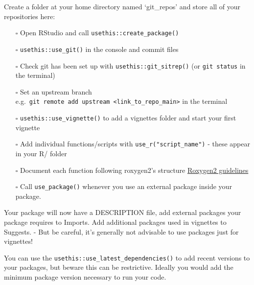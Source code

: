 \documentclass[
  letterpaper,
  DIV=11,
  numbers=noendperiod]{scrreprt}
\providecommand{\tightlist}{%
  \setlength{\itemsep}{0pt}\setlength{\parskip}{0pt}}\usepackage{longtable,booktabs,array}
\begin{document}
\begin{tcolorbox}[enhanced jigsaw, opacitybacktitle=0.6, breakable, title=\textcolor{quarto-callout-tip-color}{\faLightbulb}\hspace{0.5em}{Folder management}, arc=.35mm, colframe=quarto-callout-tip-color-frame, colbacktitle=quarto-callout-tip-color!10!white, left=2mm, bottomrule=.15mm, opacityback=0, toprule=.15mm, bottomtitle=1mm, toptitle=1mm, titlerule=0mm, leftrule=.75mm, colback=white, rightrule=.15mm, coltitle=black]

Create a folder at your home directory named `git\_repos' and store all
of your repositories here:

\end{tcolorbox}

\begin{itemize}
\tightlist
\item[$\square$]
  Open RStudio and call \texttt{usethis::create\_package()}
\item[$\square$]
  \texttt{usethis::use\_git()} in the console and commit files
\item[$\square$]
  Check git has been set up with \texttt{usethis::git\_sitrep()} (or
  \texttt{git\ status} in the terminal)
\item[$\square$]
  Set an upstream branch
  e.g.~\texttt{git\ remote\ add\ upstream\ \textless{}link\_to\_repo\_main\textgreater{}}
  in the terminal
\item[$\square$]
  \texttt{usethis::use\_vignette()} to add a vignettes folder and start
  your first vignette
\item[$\square$]
  Add individual functions/scripts with \texttt{use\_r("script\_name")}
  - these appear in your R/ folder
\item[$\square$]
  Document each function following roxygen2's structure
  \hyperref[roxygen2-gl]{Roxygen2 guidelines}
\item[$\square$]
  Call \texttt{use\_package()} whenever you use an external package
  inside your package.
\end{itemize}

\begin{tcolorbox}[enhanced jigsaw, opacitybacktitle=0.6, breakable, title=\textcolor{quarto-callout-tip-color}{\faLightbulb}\hspace{0.5em}{DESCRIPTION}, arc=.35mm, colframe=quarto-callout-tip-color-frame, colbacktitle=quarto-callout-tip-color!10!white, left=2mm, bottomrule=.15mm, opacityback=0, toprule=.15mm, bottomtitle=1mm, toptitle=1mm, titlerule=0mm, leftrule=.75mm, colback=white, rightrule=.15mm, coltitle=black]

Your package will now have a DESCRIPTION file, add external packages
your package requires to Imports. Add additional packages used in
vignettes to Suggests. - But be careful, it's generally not advisable to
use packages just for vignettes!

You can use the \texttt{usethis::use\_latest\_dependencies()} to add
recent versions to your packages, but beware this can be restrictive.
Ideally you would add the minimum package version necessary to run your
code.

\end{tcolorbox}
\end{document}
